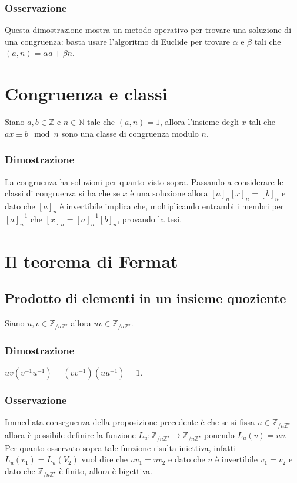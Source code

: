 \subsubsection{Osservazione}
Questa dimostrazione mostra un metodo operativo per trovare una soluzione di una congruenza: basta usare l'algoritmo di Euclide per trovare $\alpha$ e $\beta$ tali che 
$(a,n)=\alpha a+\beta n$.
\section{Congruenza e classi}
Siano $a,b\in\mathbb{Z}$ e $n\in\mathbb{N}$ tale che $(a,n)=1$, allora l'insieme degli $x$ tali che $ax\equiv b\mod n$ sono una classe di congruenza modulo $n$.
\subsubsection{Dimostrazione}
La congruenza ha soluzioni per quanto visto sopra. Passando a considerare le classi di congruenza si ha che se $x$ \`e una soluzione allora $[a]_n[x]_n=[b]_n$ e dato che $[a]_n
$ \`e invertibile implica che, moltiplicando entrambi i membri per $[a]_n^{-1}$ che $[x]_n=[a]_n^{-1}[b]_n$, provando la tesi.
\section{Il teorema di Fermat}
\subsection{Prodotto di elementi in un insieme quoziente}
Siano $u, v\in\mathbb{Z}_{/n\mathbb{Z}^\star}$ allora $uv\in\mathbb{Z}_{/n\mathbb{Z}^\star}$.
\subsubsection{Dimostrazione}
$uv(v^{-1}u^{-1})=(vv^{-1})(uu^{-1})=1$.
\subsubsection{Osservazione}
Immediata conseguenza della proposizione precedente \`e che se si fissa $u\in\mathbb{Z}_{/n\mathbb{Z}^\star}$ allora \`e possibile definire la funzione $L_u:\mathbb{Z}_{/n
\mathbb{Z}^\star}\rightarrow\mathbb{Z}_{/n\mathbb{Z}^\star}$ ponendo $L_u(v)=uv$. Per quanto osservato sopra tale funzione risulta iniettiva, infatti $L_u(v_1)=L_u(V_2)$ vuol
dire che $uv_1=uv_2$ e dato che $u$ \`e invertibile $v_1=v_2$ e dato che $\mathbb{Z}_{/n\mathbb{Z}^\star}$ \`e finito, allora \`e bigettiva.
